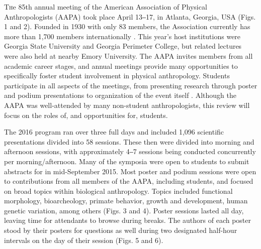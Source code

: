 \documentclass[english]{ijsra}
\begin{document}
\IJSRAopening%


\lettrine{T}he  85th annual meeting of the American Association of Physical Anthropologists (AAPA) took place April 13‒17,
in Atlanta, Georgia, USA (Figs. 1 and 2).
Founded in 1930 with only 83 members, the Association currently has more than 1,700 members internationally \parencite{american association of physical anthropologists_2016}.
This year’s host institutions were Georgia State University and Georgia Perimeter College,
but related lectures were also held at nearby Emory University.
The AAPA invites members from all academic career stages, and annual meetings provide many opportunities to
specifically foster student involvement in physical anthropology.
Students participate in all aspects of the meetings, from presenting research through poster and
podium presentations to organization of the event itself \parencite{beasley_2016}.
Although the AAPA was well-attended by many non-student anthropologists, this review will focus on the roles of,
and opportunities for, students.

The 2016 program ran over three full days and included 1,096 scientific presentations divided into 58 sessions.
These then were divided into morning and afternoon sessions, 
with approximately 4‒7 sessions being conducted concurrently per morning/afternoon. 
Many of the symposia were open to students to submit abstracts for in mid-September 2015.
Most poster and podium sessions were open to contributions from all members of the AAPA, including students,
and focused on broad topics within biological anthropology.
Topics included functional morphology, bioarcheology, primate behavior, growth and development, human genetic variation,
among others (Figs. 3 and 4).
Poster sessions lasted all day, leaving time for attendants to browse during breaks.
The authors of each poster stood by their posters for questions as well during two designated half-hour intervals on
the day of their session (Figs. 5 and 6).
\end{document}
